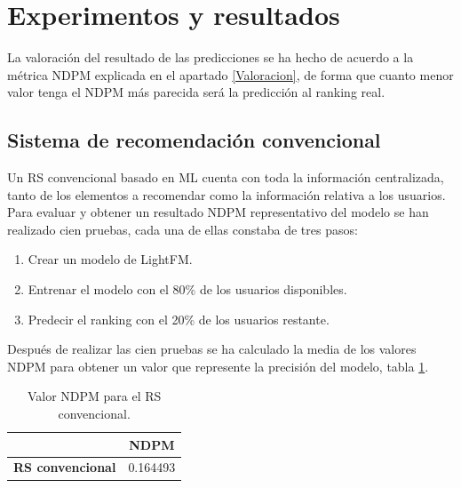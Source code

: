 \newtoggle{inTableHeader}%
\toggletrue{inTableHeader}%
\newcommand*{\StartTableHeader}{\global\toggletrue{inTableHeader}}%
\newcommand*{\EndTableHeader}{\global\togglefalse{inTableHeader}}%
\newcommand*{\figuretitle}[1]{%
    {\centering%
    \textbf{#1}%
    \par\medskip}%
}
\section{Experimentos y resultados}

La valoración del resultado de las predicciones se ha hecho de acuerdo a la métrica NDPM explicada en el apartado \ref{Valoracion}, de forma que cuanto menor valor tenga el NDPM más parecida será la predicción al ranking real.

\subsection{Sistema de recomendación convencional}

Un RS convencional basado en ML cuenta con toda la información centralizada, tanto de los elementos a recomendar como la información relativa a los usuarios. Para evaluar y obtener un resultado NDPM representativo del modelo se han realizado cien pruebas, cada una de ellas constaba de tres pasos:
\begin{enumerate}
    \item Crear un modelo de LightFM.
    \item Entrenar el modelo con el 80\% de los usuarios disponibles.
    \item Predecir el ranking con el 20\% de los usuarios restante.
\end{enumerate} 

Después de realizar las cien pruebas se ha calculado la media de los valores NDPM para obtener un valor que represente la precisión del modelo, tabla \ref{tab:NDPM_CENTRAL}.

\begin{table}[H]
    \begin{center}
        \begin{tabular}{|c|c|}
            \hline
            \rowcolor{Cyan} 
             & \textbf{NDPM} \\ 
            \hline
            \textbf{RS convencional} & 0.164493 \\
            \hline
        \end{tabular}
        \caption{\centering Valor NDPM para el RS convencional.}\label{tab:NDPM_CENTRAL}
    \end{center}    
\end{table}

